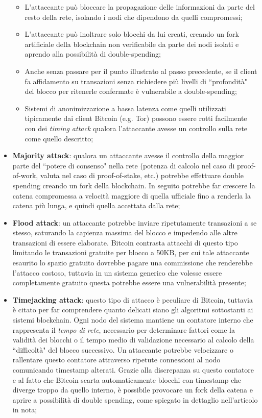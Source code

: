 \begin{itemize}
				\begin{itemize}
					\item L'attaccante può bloccare la propagazione delle informazioni da parte del resto della rete, isolando i nodi che dipendono da quelli compromessi;
					\item L'attaccante può inoltrare solo blocchi da lui creati, creando un fork artificiale della blockchain non verificabile da parte dei nodi isolati e aprendo alla possibilità di double-spending;
					\item Anche senza passare per il punto illustrato al passo precedente, se il client fa affidamento su transazioni senza richiedere più livelli di ``profondità" del blocco per ritenerle confermate è vulnerabile a double-spending;
					\item Sistemi di anonimizzazione a bassa latenza come quelli utilizzati tipicamente dai client Bitcoin (e.g. Tor) possono essere rotti facilmente con dei \emph{timing attack} qualora l'attaccante avesse un controllo sulla rete come quello descritto;
				\end{itemize}
				\item \textbf{Majority attack}: qualora un attaccante avesse il controllo della maggior parte del ``potere di consenso" nella rete (potenza di calcolo nel caso di proof-of-work, valuta nel caso di proof-of-stake, etc.) potrebbe effettuare double spending creando un fork della blockchain. In seguito potrebbe far crescere la catena compromessa a velocità maggiore di quella ufficiale fino a renderla la catena più lunga, e quindi quella accettata dalla rete;
				\item \textbf{Flood attack}: un attaccante potrebbe inviare ripetutamente transazioni a se stesso, saturando la capienza massima del blocco e impedendo alle altre transazioni di essere elaborate. Bitcoin contrasta attacchi di questo tipo limitando le transazioni gratuite per blocco a 50KB, per cui tale attaccante esaurito lo spazio gratuito dovrebbe pagare una commissione che renderebbe l'attacco costoso, tuttavia in un sistema generico che volesse essere completamente gratuito questa potrebbe essere una vulnerabilità presente;
				\item \textbf{Timejacking attack}\cite{timejacking}: questo tipo di attacco è peculiare di Bitcoin, tuttavia è citato per far comprendere quanto delicati siano gli algoritmi sottostanti ai sistemi blockchain. Ogni nodo del sistema mantiene un contatore interno che rappresenta il \emph{tempo di rete}, necessario per determinare fattori come la validità dei blocchi o il tempo medio di validazione necessario al calcolo della ``difficoltà" del blocco successivo. Un attaccante potrebbe velocizzare o rallentare questo contatore attraverso ripetute connessioni al nodo comunicando timestamp alterati. Grazie alla discrepanza su questo contatore e al fatto che Bitcoin scarta automaticamente blocchi con timestamp che diverge troppo da quello interno, è possibile provocare un fork della catena e aprire a possibilità di double spending, come spiegato in dettaglio nell'articolo in nota;
			\end{itemize}
